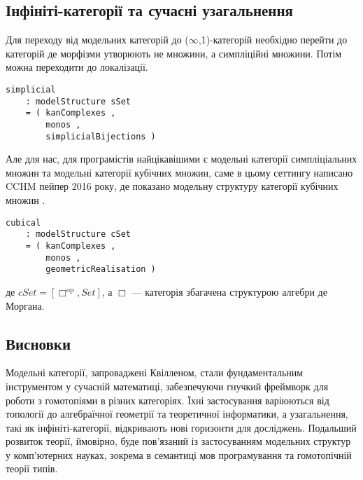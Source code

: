 \documentclass[12pt]{article}
\theoremstyle{plain}
\theoremstyle{definition}
\theoremstyle{remark}
\begin{document}
\subsection{Інфініті-категорії та сучасні узагальнення}
Для переходу від модельних категорій до ($\infty$,1)-категорій необхідно перейти до категорій де морфізми утворюють не множини, а симпліційні множини. Потім можна переходити до локалізації.

\begin{lstlisting}
simplicial
    : modelStructure sSet
    = ( kanComplexes ,
        monos ,
        simplicialBijections )
\end{lstlisting}

Але для нас, для програмістів найцікавішими є модельні категорії симпліціальних множин та модельні категорії кубічних множин, саме в цьому сеттингу написано CCHM пейпер 2016 року, де показано модельну структуру категорії кубічних множин \cite{Cavallo19}.

\begin{lstlisting}
cubical
    : modelStructure cSet
    = ( kanComplexes ,
        monos ,
        geometricRealisation )
\end{lstlisting}

де $cSet = [\Box^{\mathrm{op}},Set]$, а $\Box$ — категорія збагачена структурою алгебри де Моргана.

\subsection{Висновки}
Модельні категорії, запроваджені Квілленом, стали фундаментальним інструментом у сучасній математиці, забезпечуючи гнучкий фреймворк для роботи з гомотопіями в різних категоріях. Їхні застосування варіюються від топології до алгебраїчної геометрії та теоретичної інформатики, а узагальнення, такі як інфініті-категорії, відкривають нові горизонти для досліджень. Подальший розвиток теорії, ймовірно, буде пов’язаний із застосуванням модельних структур у комп’ютерних науках, зокрема в семантиці мов програмування та гомотопічній теорії типів.
\end{document}
